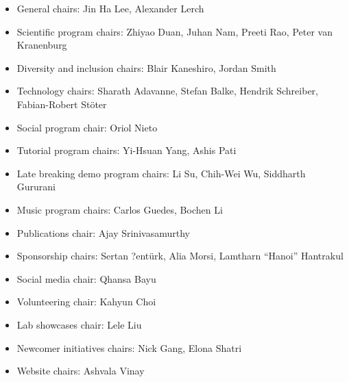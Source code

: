 \documentclass[%
10pt,								%
]
{scrartcl}
\begin{document}
    \begin{itemize}
        \item   General chairs: Jin Ha Lee, Alexander Lerch
        \item   Scientific program chairs: Zhiyao Duan, Juhan Nam, Preeti Rao, Peter van Kranenburg
        \item   Diversity and inclusion chairs: Blair Kaneshiro, Jordan Smith
        \item   Technology chairs: Sharath Adavanne, Stefan Balke, Hendrik Schreiber, Fabian-Robert Stöter
        \item   Social program chair: Oriol Nieto
        \item   Tutorial program chairs: Yi-Hsuan Yang, Ashis Pati
        \item   Late breaking demo program chairs: Li Su, Chih-Wei Wu, Siddharth Gururani
        \item   Music program chairs: Carlos Guedes, Bochen Li
        \item   Publications chair: Ajay Srinivasamurthy
        \item   Sponsorship chairs: Sertan ?entürk, Alia Morsi, Lamtharn “Hanoi” Hantrakul
        \item   Social media chair: Qhansa Bayu
        \item   Volunteering chair: Kahyun Choi
        \item   Lab showcases chair: Lele Liu
        \item   Newcomer initiatives chairs: Nick Gang, Elona Shatri
        \item   Website chairs: Ashvala Vinay
    \end{itemize}
\end{document}
